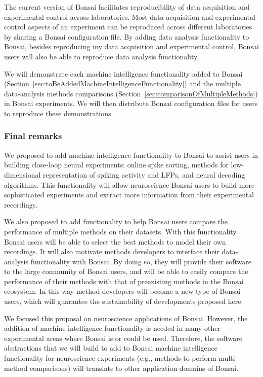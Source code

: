 \documentclass[a4paper,11point]{article}
\begin{document}
The current version of Bonsai facilitates reproducibility of data acquisition
and experimental control across laboratories. Most data acquisition and
experimental control aspects of an experiment can be reproduced across
different laboratories by sharing a Bonsai configuration file.
%
By adding data analysis functionality to Bonsai, besides reproducing my data
acquisition and experimental control, Bonsai users will also be able to reproduce
data analysis functionality.

We will demonstrate each machine intelligence functionality added to Bonsai
(Section~\ref{sec:toBeAddedMachineIntelligenceFunctionality}) and the multiple
data-analysis methods comparisons
(Section~\ref{sec:comparisonOfMultipleMethods}) in Bonsai experiments. We will
then distribute Bonsai configuration files for users to reproduce these
demonstrations.

\subsubsection{Final remarks}
\label{sec:finalRemarks}

We proposed to add machine intelligence functionality to Bonsai to assist users
in building close-loop neural experiments: online spike sorting, methods for
low-dimensional representation of spiking activity and LFPs, and neural
decoding algorithms. This functionality will allow neuroscience Bonsai users to
build more sophisticated experiments and extract more information from their
experimental recordings.

We also proposed to add functionality to help Bonsai users compare the
performance of multiple methods on their datasets. With this functionality
Bonsai users will be able to select the best methods to model their own
recordings. It will also motivate methods developers to interface their
data-analysis functionality with Bonsai. By doing so, they will provide their
software to the large community of Bonsai users, and will be able to easily
compare the performance of their methods with that of preexisting methods in the
Bonsai ecosystem. In this way method developers will become a new type of
Bonsai users, which will guarantee the sustainability of developments
proposed here.

We focused this proposal on neuroscience applications of Bonsai. However, the
addition of machine intelligence functionality is needed in many other
experimental areas where Bonsai is or could be used. Therefore, the software
abstractions that we will build to add to Bonsai machine intelligence
functionality for neuroscience experiments (e.g., methods to perform
multi-method comparisons) will translate to other application domains of
Bonsai.
\end{document}
